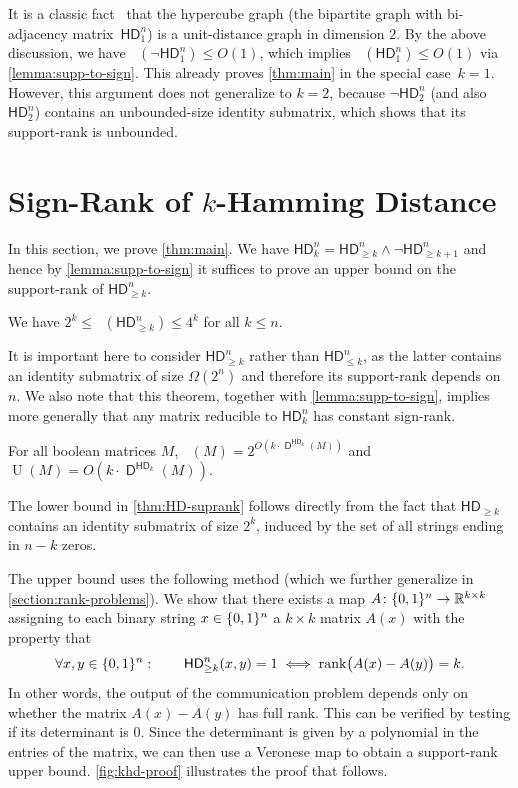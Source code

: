 \documentclass{article}
\DeclareMathOperator{\signrank}{rank_\pm}
\DeclareMathOperator{\suprank}{rank_0}
\DeclareMathOperator{\U}{U}
\DeclareMathOperator{\rank}{rank}
\DeclareMathOperator{\D}{\mathsf{D}}
\newcommand{\HD}[1]{\mathsf{HD}_{#1}}
\begin{document}
It is a classic fact~\cite{EHT65} that the hypercube graph (the bipartite graph with
bi-adjacency matrix~$\HD{1}^n$) is a unit-distance graph in dimension $2$. By the above discussion, we have $\suprank(\neg\HD{1}^n)\leq O(1)$, which implies $\signrank(\HD{1}^n)\leq O(1)$ via \cref{lemma:supp-to-sign}. This already proves \cref{thm:main} in the special case~$k=1$. However, this argument does not generalize to $k = 2$, because $\neg\HD{2}^n$ (and also $\HD{2}^n$) contains an unbounded-size identity submatrix, which shows that its support-rank is unbounded.


\section{Sign-Rank of \texorpdfstring{$k$}{k}-Hamming Distance} \label{sec:proof-of-main-thm}

In this section, we prove \cref{thm:main}. We have $\HD{k}^n = \HD{\geq k}^n\land \neg\HD{\geq k+1}^n$ and hence by \cref{lemma:supp-to-sign} it suffices to prove an upper bound on the support-rank of $\HD{\geq k}^n$.
\begin{boxtheorem}\label{thm:HD-suprank}
We have $2^k \leq \suprank(\HD{\geq k}^n) \leq 4^k$ for all $k\leq n$.
\end{boxtheorem}
It is important here to consider $\HD{\geq k}^n$ rather than $\HD{\leq k}^n$, as the latter contains an identity submatrix
of size $\Omega(2^n)$ and therefore its support-rank depends on $n$. We also note that this theorem, together with \cref{lemma:supp-to-sign}, implies more generally that any matrix reducible to $\HD{k}^n$ has constant sign-rank.
\begin{corollary}\label{cor:reductions-to-HD}
    For all boolean matrices $M$, $\signrank(M) = 2^{O(k \cdot \D^{\HD{k}}(M))}$ and $\U(M) = O(k \cdot \D^{\HD{k}}(M) )$.
\end{corollary}


The lower bound in \cref{thm:HD-suprank} follows directly from the fact that $\HD{\geq k}$ contains an identity submatrix of size $2^k$, induced by the set of all strings ending in $n-k$ zeros. 

The upper bound uses the following method (which we further generalize in \cref{section:rank-problems}). We show that there exists a map $A \colon \{0,1\}^n \to \mathbb{R}^{k \times k}$ assigning to each binary string $x\in \{0,1\}^n$ a $k\times k$ matrix $A(x)$ with the property that
\begin{equation}
\label{eq:intro-hd-rankproblem}
    \forall x,y \in \zo^n \,\colon\qquad \HD{\geq k}^n(x,y) = 1 \iff \rank\!\big( A(x) - A(y) \big) = k .
\end{equation}
In other words, the output of the communication problem depends only on whether the matrix $A(x)-A(y)$ has full rank. This can be verified by testing if its determinant is $0$. Since the determinant is given by a polynomial in the entries of the matrix, we can then use a Veronese map to obtain a support-rank upper bound. \cref{fig:khd-proof} illustrates the proof that follows.
\end{document}
